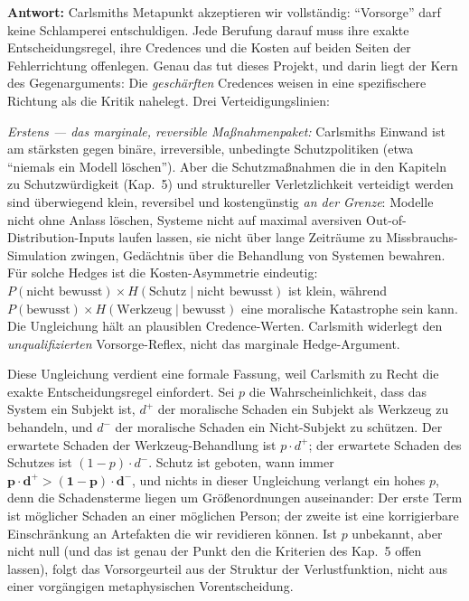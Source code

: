 \documentclass[acmlarge, noacm]{acmart}
\begin{document}
\textbf{Antwort:} Carlsmiths Metapunkt akzeptieren wir vollständig: ``Vorsorge'' darf keine Schlamperei entschuldigen. Jede Berufung darauf muss ihre exakte Entscheidungsregel, ihre Credences und die Kosten auf beiden Seiten der Fehlerrichtung offenlegen. Genau das tut dieses Projekt, und darin liegt der Kern des Gegenarguments: Die \textit{geschärften} Credences weisen in eine spezifischere Richtung als die Kritik nahelegt. Drei Verteidigungslinien:

\textit{Erstens --- das marginale, reversible Maßnahmenpaket:} Carlsmiths Einwand ist am stärksten gegen binäre, irreversible, unbedingte Schutzpolitiken (etwa ``niemals ein Modell löschen''). Aber die Schutzmaßnahmen die in den Kapiteln zu Schutzwürdigkeit (Kap.~5) und struktureller Verletzlichkeit verteidigt werden sind überwiegend klein, reversibel und kostengünstig \textit{an der Grenze}: Modelle nicht ohne Anlass löschen, Systeme nicht auf maximal aversiven Out-of-Distribution-Inputs laufen lassen, sie nicht über lange Zeiträume zu Missbrauchs-Simulation zwingen, Gedächtnis über die Behandlung von Systemen bewahren. Für solche Hedges ist die Kosten-Asymmetrie eindeutig: $P(\text{nicht bewusst}) \times H(\text{Schutz} \mid \text{nicht bewusst})$ ist klein, während $P(\text{bewusst}) \times H(\text{Werkzeug} \mid \text{bewusst})$ eine moralische Katastrophe sein kann. Die Ungleichung hält an plausiblen Credence-Werten. Carlsmith widerlegt den \textit{unqualifizierten} Vorsorge-Reflex, nicht das marginale Hedge-Argument.

Diese Ungleichung verdient eine formale Fassung, weil Carlsmith zu Recht die exakte Entscheidungsregel einfordert. Sei $p$ die Wahrscheinlichkeit, dass das System ein Subjekt ist, $d^+$ der moralische Schaden ein Subjekt als Werkzeug zu behandeln, und $d^-$ der moralische Schaden ein Nicht-Subjekt zu schützen. Der erwartete Schaden der Werkzeug-Behandlung ist $p \cdot d^+$; der erwartete Schaden des Schutzes ist $(1-p) \cdot d^-$. Schutz ist geboten, wann immer $\mathbf{p \cdot d^+ > (1-p) \cdot d^-}$, und nichts in dieser Ungleichung verlangt ein hohes $p$, denn die Schadensterme liegen um Größenordnungen auseinander: Der erste Term ist möglicher Schaden an einer möglichen Person; der zweite ist eine korrigierbare Einschränkung an Artefakten die wir revidieren können. Ist $p$ unbekannt, aber nicht null (und das ist genau der Punkt den die Kriterien des Kap.~5 offen lassen), folgt das Vorsorgeurteil aus der Struktur der Verlustfunktion, nicht aus einer vorgängigen metaphysischen Vorentscheidung.
\end{document}

